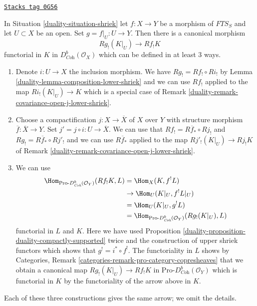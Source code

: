 \begin{remark}
\label{duality-remark-covariance-open-lower-shriek}
\href{https://stacks.math.columbia.edu/tag/0G56}{\texttt{Stacks tag 0G56}}

In Situation \ref{duality-situation-shriek} let $f : X \to Y$ be a morphism of
$\textit{FTS}_S$ and let $U \subset X$ be an open. Set
$g = f|_U : U \to Y$. Then there is a canonical morphism
$$
Rg_!(K|_U) \longrightarrow Rf_!K
$$
functorial in $K$ in $D^b_{\textit{Coh}}(\mathcal{O}_X)$
which can be defined in at least 3 ways.
\begin{enumerate}
\item Denote $i : U \to X$ the inclusion morphism. We have
$Rg_! = Rf_! \circ Ri_!$ by
Lemma \ref{duality-lemma-composition-lower-shriek}
and we can use $Rf_!$ applied to the map $Ri_!(K|_U) \to K$
which is a special case of
Remark \ref{duality-remark-covariance-open-j-lower-shriek}.
\item Choose a compactification $j : X \to \overline{X}$
of $X$ over $Y$ with structure morphism $\overline{f} : \overline{X} \to Y$.
Set $j' = j \circ i : U \to \overline{X}$. We can
use that $Rf_! = R\overline{f}_* \circ Rj_!$ and
$Rg_! = R\overline{f}_* \circ Rj'_!$
and we can use $R\overline{f}_*$ applied to the map
$Rj'_!(K|_U) \to Rj_!K$ of
Remark \ref{duality-remark-covariance-open-j-lower-shriek}.
\item We can use
\begin{align*}
\Hom_{\text{Pro-}D^b_{\textit{Coh}}(\mathcal{O}_Y)}(Rf_!K, L)
& =
\Hom_X(K, f^!L) \\
& \to
\Hom_U(K|_U, f^!L|_U) \\
& =
\Hom_U(K|_U, g^!L) \\
& =
\Hom_{\text{Pro-}D^b_{\textit{Coh}}(\mathcal{O}_Y)}(Rg_!(K|_U), L)
\end{align*}
functorial in $L$ and $K$. Here we have used
Proposition \ref{duality-proposition-duality-compactly-supported}
twice and the construction of upper shriek functors which
shows that $g^! = i^* \circ f^!$. The functoriality in $L$ shows by
Categories, Remark \ref{categories-remark-pro-category-copresheaves}
that we obtain a canonical map $Rg_!(K|_U) \to Rf_!K$ in
$\text{Pro-}D^b_{\textit{Coh}}(\mathcal{O}_Y)$ which is
functorial in $K$ by the functoriality of the arrow above in $K$.
\end{enumerate}
Each of these three constructions gives the same arrow; we omit the
details.
\end{remark}

